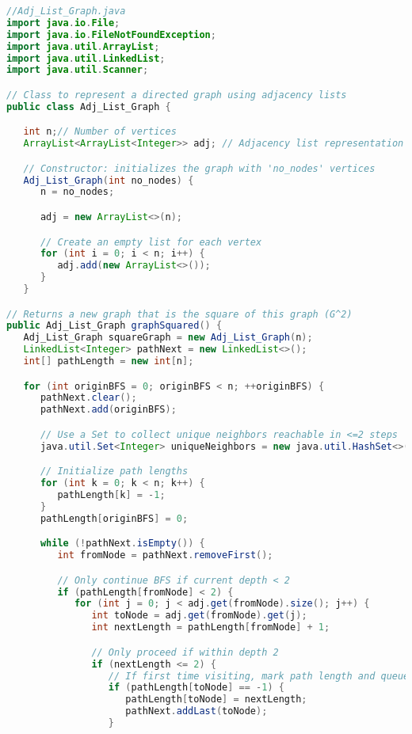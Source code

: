 \documentclass[11pt]{article}
\begin{document}
\lstset{
    basicstyle=\ttfamily\footnotesize,
    breaklines=true,
    frame=single,
    numbers=left,
    tabsize=4,
    showstringspaces=false
}
\begin{lstlisting}[language=Java]
//Adj_List_Graph.java
import java.io.File;
import java.io.FileNotFoundException;
import java.util.ArrayList;
import java.util.LinkedList;
import java.util.Scanner;

// Class to represent a directed graph using adjacency lists
public class Adj_List_Graph {

   int n;// Number of vertices
   ArrayList<ArrayList<Integer>> adj; // Adjacency list representation

   // Constructor: initializes the graph with 'no_nodes' vertices
   Adj_List_Graph(int no_nodes) {
      n = no_nodes;

      adj = new ArrayList<>(n);

      // Create an empty list for each vertex
      for (int i = 0; i < n; i++) {
         adj.add(new ArrayList<>());
      }
   }

// Returns a new graph that is the square of this graph (G^2)
public Adj_List_Graph graphSquared() {
   Adj_List_Graph squareGraph = new Adj_List_Graph(n);
   LinkedList<Integer> pathNext = new LinkedList<>();
   int[] pathLength = new int[n];

   for (int originBFS = 0; originBFS < n; ++originBFS) {
      pathNext.clear();
      pathNext.add(originBFS);

      // Use a Set to collect unique neighbors reachable in <=2 steps
      java.util.Set<Integer> uniqueNeighbors = new java.util.HashSet<>();

      // Initialize path lengths
      for (int k = 0; k < n; k++) {
         pathLength[k] = -1;
      }
      pathLength[originBFS] = 0;

      while (!pathNext.isEmpty()) {
         int fromNode = pathNext.removeFirst();

         // Only continue BFS if current depth < 2
         if (pathLength[fromNode] < 2) {
            for (int j = 0; j < adj.get(fromNode).size(); j++) {
               int toNode = adj.get(fromNode).get(j);
               int nextLength = pathLength[fromNode] + 1;

               // Only proceed if within depth 2
               if (nextLength <= 2) {
                  // If first time visiting, mark path length and queue for next step
                  if (pathLength[toNode] == -1) {
                     pathLength[toNode] = nextLength;
                     pathNext.addLast(toNode);
                  }


\end{lstlisting}
\end{document}

